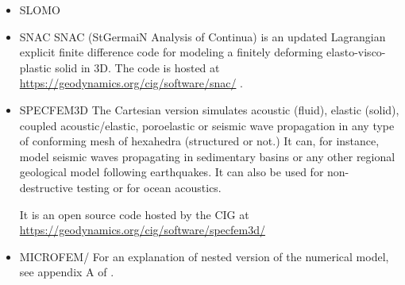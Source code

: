 \begin{itemize}
{\small
\noindent
\cite{poso08}
\cite{qusp10}
\cite{brps12}
\cite{brps13}
\cite{brau13}
\cite{brun14}
\cite{hebr14}
\cite{kobf14}
\cite{clbq15}
\cite{brcr17}
\cite{basq18}\cite{osss18}\cite{osss18b}
}

\item {\codefont SLOMO} 

{\small
\noindent
\cite{kaus05}
\cite{kasb08}
}

\item {\codefont SNAC} 
SNAC (StGermaiN Analysis of Continua) is an updated Lagrangian explicit finite 
difference code for modeling a finitely deforming elasto-visco-plastic solid in 3D.
The code is hosted at \url{https://geodynamics.org/cig/software/snac/} .

\begin{scriptsize}
\cite{chlg08}
\cite{chgu08}
\cite{qula10}
\cite{chss11}
\end{scriptsize}


\item {\codefont SPECFEM3D} 
The Cartesian version simulates acoustic (fluid), elastic (solid), coupled acoustic/elastic, 
poroelastic or seismic wave propagation in any type of conforming mesh of hexahedra 
(structured or not.) It can, for instance, model seismic waves propagating in sedimentary 
basins or any other regional geological model following earthquakes. It can also be used 
for non-destructive testing or for ocean acoustics. 

It is an open source code hosted by the CIG at 
\url{https://geodynamics.org/cig/software/specfem3d/}

{\small
\noindent
\cite{kott05}
}

\item {\codefont MICROFEM}/\sopale
{}
For an explanation of nested version of the numerical model, see appendix A of \cite{webe18}.


\end{itemize}
